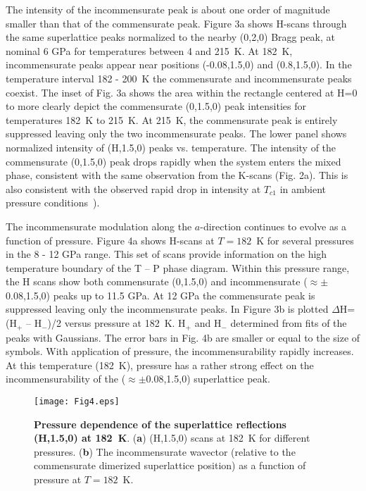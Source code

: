 \documentclass[preprint,superscriptaddress,amsmath,amssymb,aps,prl]{revtex4-1}
\begin{document}
The intensity of the incommensurate peak is about one order of magnitude smaller than that of the commensurate peak. Figure 3a shows H-scans through the same superlattice peaks normalized to the nearby (0,2,0) Bragg peak, at nominal 6 GPa for temperatures between 4 and 215~K. At 182~K, incommensurate peaks appear near positions (-0.08,1.5,0) and (0.8,1.5,0). In the temperature interval 182 - 200~K the commensurate and incommensurate peaks coexist. The inset of Fig. 3a shows the area within the rectangle centered at H=0 to more clearly depict the commensurate (0,1.5,0) peak intensities for temperatures 182~K to 215~K. At 215~K, the commensurate peak is entirely suppressed leaving only the two incommensurate peaks. The lower panel shows normalized intensity of (H,1.5,0) peaks vs. temperature. The intensity of the commensurate (0,1.5,0) peak drops rapidly when the system enters the mixed phase, consistent with the same observation from the K-scans (Fig. 2a). This is also consistent with the observed rapid drop in intensity at $T_{c1}$ in ambient pressure conditions~\cite{Abel2007}).

The incommensurate modulation along the $a$-direction continues to evolve as a function of pressure. Figure 4a shows H-scans at $T=182$~K for several pressures in the 8 - 12 GPa range. This set of scans provide information on the high temperature boundary of the T -- P phase diagram. Within this pressure range, the H scans show both commensurate (0,1.5,0) and incommensurate ($\approx\pm$0.08,1.5,0) peaks up to 11.5 GPa. At 12 GPa the commensurate peak is suppressed leaving only the incommensurate peaks. In Figure 3b is plotted $\Delta$H=(H$_{+}$ -- H$_{-}$)/2 versus pressure at 182~K. H$_{+}$ and H$_{-}$ determined from fits of the peaks with Gaussians. The error bars in Fig. 4b are smaller or equal to the size of symbols. With application of pressure, the incommensurability rapidly increases. At this temperature (182~K), pressure has a rather strong effect on the incommensurability of the ($\approx\pm$0.08,1.5,0) superlattice peak.

\begin{center}
\begin{figure}
\begin{center}
\texttt{[image: Fig4.eps]}
\caption{\textbf{Pressure dependence of the superlattice reflections (H,1.5,0) at 182~K}. (\textbf{a}) (H,1.5,0) scans at 182~K for different pressures. (\textbf{b}) The incommensurate wavector (relative to the commensurate dimerized superlattice position)  as a function of pressure at $T=182$~K.}
\label{fig:Fig4}
\end{center}
\end{figure}
\end{center}
\end{document}
